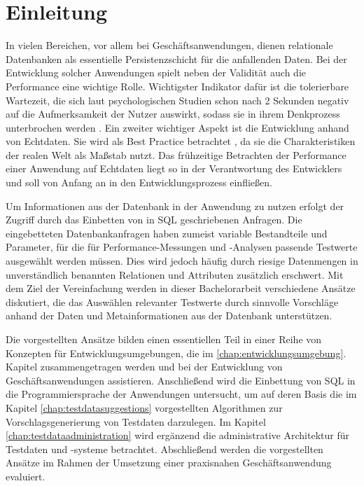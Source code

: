 \section{Einleitung}\label{chap:introduction}

%
%

In vielen Bereichen, vor allem bei Geschäftsanwendungen, dienen relationale Datenbanken als essentielle Persistenzschicht für die anfallenden Daten.
Bei der Entwicklung solcher Anwendungen spielt neben der Validität auch die Performance eine wichtige Rolle.
Wichtigster Indikator dafür ist die tolerierbare Wartezeit, die sich laut psychologischen Studien schon nach 2 Sekunden negativ auf die Aufmerksamkeit der Nutzer auswirkt, sodass sie in ihrem Denkprozess unterbrochen werden \cite{Nah04}.
Ein zweiter wichtiger Aspekt ist die Entwicklung anhand von Echtdaten.
Sie wird als Best Practice betrachtet \cite[S. 212]{Plattner:2013:CID:2490529}, da sie die Charakteristiken der realen Welt als Maßstab nutzt.
Das frühzeitige Betrachten der Performance einer Anwendung auf Echtdaten liegt so in der Verantwortung des Entwicklers und soll von Anfang an in den Entwicklungsprozess einfließen.

Um Informationen aus der Datenbank in der Anwendung zu nutzen erfolgt der Zugriff durch das Einbetten von in SQL geschriebenen Anfragen.
Die eingebetteten Datenbankanfragen haben zumeist variable Bestandteile und Parameter, für die für Performance-Messungen und -Analysen passende Testwerte ausgewählt werden müssen.
Dies wird jedoch häufig durch riesige Datenmengen in unverständlich benannten Relationen und Attributen zusätzlich erschwert.
Mit dem Ziel der Vereinfachung werden in dieser Bachelorarbeit verschiedene Ansätze diskutiert, die das Auswählen relevanter Testwerte durch sinnvolle Vorschläge anhand der Daten und Metainformationen aus der Datenbank unterstützen.

Die vorgestellten Ansätze bilden einen essentiellen Teil in einer Reihe von Konzepten für Entwicklungsumgebungen, die im \ref{chap:entwicklungsumgebung}. Kapitel zusammengetragen werden und bei der Entwicklung von Geschäftsanwendungen assistieren.
Anschließend wird die Einbettung von SQL in die Programmiersprache der Anwendungen untersucht, um auf deren Basis die im Kapitel \ref{chap:testdatasuggestions} vorgestellten Algorithmen zur Vorschlagsgenerierung von Testdaten darzulegen.
Im Kapitel \ref{chap:testdataadministration} wird ergänzend die administrative Architektur für Testdaten und -systeme betrachtet.
Abschließend werden die vorgestellten Ansätze im Rahmen der Umsetzung einer praxisnahen Geschäftsanwendung evaluiert.